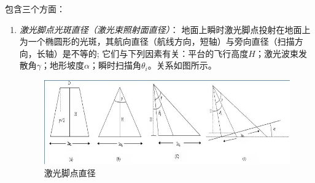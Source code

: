 包含三个方面：
\begin{enumerate}
	\item \textit{激光脚点光斑直径（激光束照射面直径）}：
		地面上瞬时激光脚点投射在地面上为一个椭圆形的光斑，其航向直径（航线方向，短轴）与旁向直径（扫描方向，长轴）是不等的;
		它们与下列因素有关：平台的飞行高度$ H $；激光波束发散角$ γ $；地形坡度$ α $；瞬时扫描角$ θ_i $。关系如图所示。
		
		\begin{figure}[htbp]
			\centering
			\includegraphics[width=0.8\linewidth]{figure/Chapter4/激光脚点直径}
			\caption{激光脚点直径}
			\label{fig:激光脚点直径}
		\end{figure}
		

\end{enumerate}
